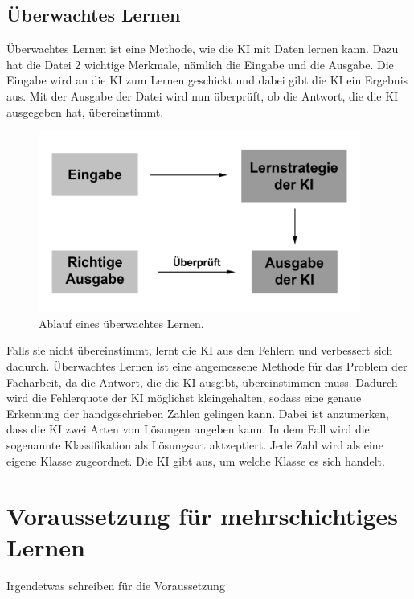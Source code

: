 \documentclass[11pt]{article}
\begin{document}
\subsection{Überwachtes Lernen}
Überwachtes Lernen ist eine Methode, wie die KI mit Daten lernen kann. Dazu hat die Datei 2 wichtige Merkmale, nämlich die Eingabe und die
Ausgabe. Die Eingabe wird an die KI zum Lernen geschickt und dabei gibt die KI ein Ergebnis aus. Mit der Ausgabe der Datei wird nun überprüft, ob
die Antwort, die die KI ausgegeben hat, übereinstimmt.
\begin{figure}[h]
    \centering
    \includegraphics[width=300pt, keepaspectratio]{images/slearning}
    \caption{Ablauf eines überwachtes Lernen.}
\end{figure}
Falls sie nicht übereinstimmt, lernt die KI aus den Fehlern und verbessert sich
dadurch. Überwachtes Lernen ist eine angemessene Methode für das Problem der Facharbeit, da die Antwort, die die KI ausgibt, übereinstimmen muss.
Dadurch wird die Fehlerquote der KI möglichst kleingehalten, sodass eine genaue Erkennung der handgeschrieben Zahlen gelingen kann.
Dabei ist anzumerken, dass die KI zwei Arten von Lösungen angeben kann. In dem Fall wird die sogenannte Klassifikation als Lösungsart aktzeptiert.
Jede Zahl wird als eine eigene Klasse zugeordnet. Die KI gibt aus, um welche Klasse es sich handelt.

\section{Voraussetzung für mehrschichtiges Lernen}

Irgendetwas schreiben für die Voraussetzung
\end{document}
